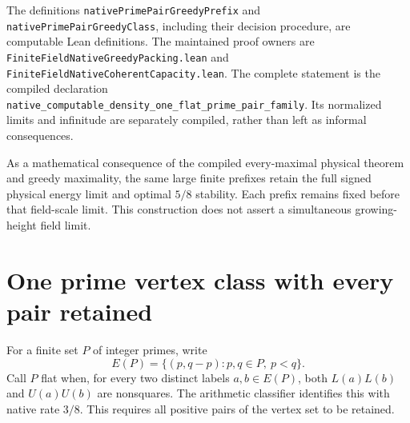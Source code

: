 \documentclass[11pt]{article}
\begin{document}
The definitions \texttt{nativePrimePairGreedyPrefix} and
\texttt{nativePrimePairGreedyClass}, including their decision procedure,
are computable Lean definitions. The maintained proof owners are
\texttt{FiniteFieldNativeGreedyPacking.lean} and
\texttt{FiniteFieldNativeCoherentCapacity.lean}. The complete statement is
the compiled declaration
\texttt{native\_computable\_density\_one\_flat\_prime\_pair\_family}.
Its normalized limits and infinitude are separately compiled, rather
than left as informal consequences.

As a mathematical consequence of the compiled every-maximal physical
theorem and greedy maximality, the same large finite prefixes retain
the full signed physical energy limit and optimal \(5/8\) stability.
Each prefix remains fixed before that field-scale limit.
This construction does not assert a simultaneous growing-height field limit.

\section{One prime vertex class with every pair retained}
\label{sec:native-complete-prime-vertices}
For a finite set \(P\) of integer primes, write
\[
 E(P)=\{(p,q-p):p,q\in P,\ p<q\}.
\]
Call \(P\) flat when, for every two distinct labels \(a,b\in E(P)\),
both \(L(a)L(b)\) and \(U(a)U(b)\) are nonsquares. The arithmetic
classifier identifies this with native rate \(3/8\). This requires
all positive pairs of the vertex set to be retained.
\end{document}
